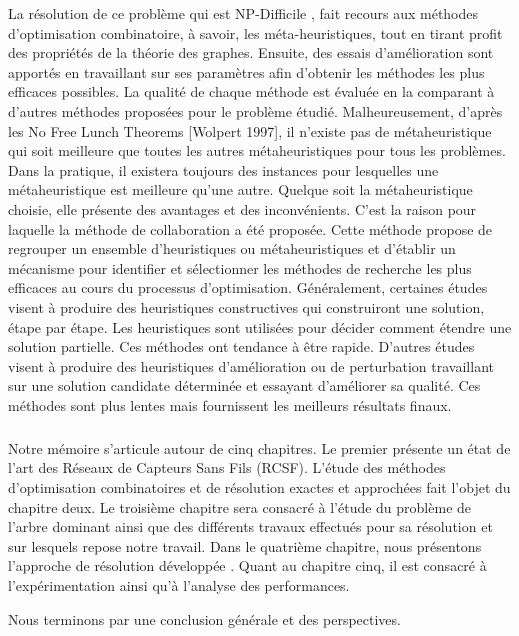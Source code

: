 La résolution de ce problème qui est NP-Difficile \cite{shin2010approximation,zhang2008new} , fait recours aux méthodes d’optimisation combinatoire, à savoir, les méta-heuristiques, tout en tirant profit des propriétés de la théorie des graphes. Ensuite, des essais d'amélioration sont apportés en travaillant sur ses paramètres afin d'obtenir les méthodes les plus efficaces possibles. La qualité de chaque méthode est évaluée en la comparant à d'autres méthodes proposées pour le problème étudié. Malheureusement, d'après les No Free Lunch Theorems [Wolpert 1997], il n'existe pas de métaheuristique qui soit meilleure que toutes les autres métaheuristiques pour tous les problèmes. Dans la pratique, il existera toujours des instances pour lesquelles une métaheuristique est meilleure qu'une autre. Quelque soit la métaheuristique choisie, elle présente des avantages et des inconvénients. C’est la raison pour laquelle la méthode de collaboration a été proposée. Cette méthode propose de regrouper un ensemble d'heuristiques ou métaheuristiques et d'établir un mécanisme pour identifier et sélectionner les méthodes de recherche les plus efficaces au cours du processus d'optimisation. Généralement, certaines études visent à produire des heuristiques constructives qui construiront une solution, étape par étape. Les heuristiques sont utilisées pour décider comment étendre une solution partielle. Ces méthodes ont tendance à être rapide. D'autres études visent à produire des heuristiques d'amélioration ou de perturbation travaillant sur une solution candidate déterminée et essayant d'améliorer sa qualité. Ces méthodes sont plus lentes mais fournissent les meilleurs résultats finaux. 

\subparagraph{}
Notre mémoire s’articule autour de cinq chapitres. Le premier présente un état de l’art des Réseaux de Capteurs Sans Fils (RCSF). L’étude des méthodes d’optimisation combinatoires et de résolution exactes et approchées fait l’objet du chapitre deux. Le troisième chapitre sera consacré à l’étude du problème de l’arbre dominant ainsi que des différents travaux effectués pour sa résolution et sur lesquels repose notre travail. Dans le quatrième chapitre, nous présentons l’approche de résolution développée . Quant au chapitre cinq, il est consacré à l’expérimentation ainsi qu’à l’analyse des
performances.

Nous terminons par une conclusion générale et des perspectives.
